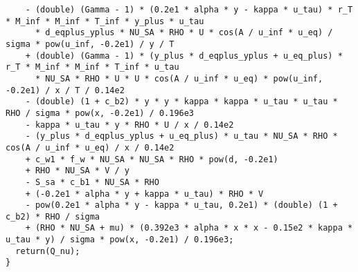 \documentclass[10pt]{article}
\begin{document}
\begin{footnotesize}
\begin{verbatim}
    - (double) (Gamma - 1) * (0.2e1 * alpha * y - kappa * u_tau) * r_T * M_inf * M_inf * T_inf * y_plus * u_tau 
      * d_eqplus_yplus * NU_SA * RHO * U * cos(A / u_inf * u_eq) / sigma * pow(u_inf, -0.2e1) / y / T 
    + (double) (Gamma - 1) * (y_plus * d_eqplus_yplus + u_eq_plus) * r_T * M_inf * M_inf * T_inf * u_tau 
      * NU_SA * RHO * U * U * cos(A / u_inf * u_eq) * pow(u_inf, -0.2e1) / x / T / 0.14e2 
    - (double) (1 + c_b2) * y * y * kappa * kappa * u_tau * u_tau * RHO / sigma * pow(x, -0.2e1) / 0.196e3 
    - kappa * u_tau * y * RHO * U / x / 0.14e2 
    - (y_plus * d_eqplus_yplus + u_eq_plus) * u_tau * NU_SA * RHO * cos(A / u_inf * u_eq) / x / 0.14e2 
    + c_w1 * f_w * NU_SA * NU_SA * RHO * pow(d, -0.2e1) 
    + RHO * NU_SA * V / y 
    - S_sa * c_b1 * NU_SA * RHO 
    + (-0.2e1 * alpha * y + kappa * u_tau) * RHO * V 
    - pow(0.2e1 * alpha * y - kappa * u_tau, 0.2e1) * (double) (1 + c_b2) * RHO / sigma 
    + (RHO * NU_SA + mu) * (0.392e3 * alpha * x * x - 0.15e2 * kappa * u_tau * y) / sigma * pow(x, -0.2e1) / 0.196e3;
  return(Q_nu);
}
\end{verbatim}
\end{footnotesize}


 



\appendix


\end{document}
